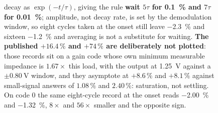 \begin{figure}[!htb]
{  decay as \(\exp(-t/\tau)\), giving the rule \textbf{wait \(5\tau\) for
  \SI{0.1}{\percent} and \(7\tau\) for \SI{0.01}{\percent}}; amplitude, not
  decay rate, is set by the demodulation window, so eight cycles taken at the
  onset still leave \SI{-2.3}{\percent} and sixteen \SI{-1.2}{\percent} and
  averaging is not a substitute for waiting. \textbf{The published
  \(+16.4\,\%\) and \(+74\,\%\) are deliberately not plotted}: those records sit
  on a gain code whose own minimum measurable impedance is \(1.67\times\) this
  load, with the output at \SI{1.25}{\volt} against a
  \(\pm\SI{0.80}{\volt}\) window, and they asymptote at \(+8.6\,\%\) and
  \(+8.1\,\%\) against small-signal answers of \(1.08\,\%\) and \(2.40\,\%\):
  saturation, not settling. On code 0 the same eight-cycle record at the onset
  reads \SI{-2.00}{\percent} and \SI{-1.32}{\percent}, \(8\times\) and
  \(56\times\) smaller and the opposite sign.}
  \label{fig:eis-settling}
\end{figure}

